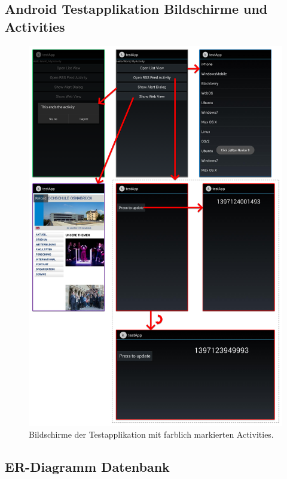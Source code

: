 \subsection{Android Testapplikation Bildschirme und Activities \label{anhang:test_app_screens}}
\begin{figure}[htb]
	\centering
	\includegraphics[width=0.7\linewidth]{img/client_test_app_screens}
	\caption{Bildschirme der Testapplikation mit farblich markierten Activities. \label{fig:client_test_app_screens}}
\end{figure}

\newpage

\subsection{ER-Diagramm Datenbank\label{apdx:db}}

